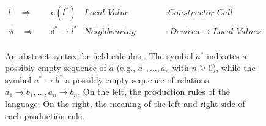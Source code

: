 \begin{figure}
{\begin{minipage}{0.95\textwidth}
\begin{align*}
        l \quad\Rightarrow\quad    & \texttt{c}(l^*)                      & \textit{Local Value}          & : \textit{Constructor Call}                          \\
        \phi \quad\Rightarrow\quad & \delta^* \rightarrow l^*             & \textit{Neighbouring Value}   & : \textit{Devices} \rightarrow \textit{Local Values} \\
      \end{align*}
    \end{minipage}
  }
  \caption[An abstract syntax for field calculus]{
  An abstract syntax for field calculus \cite{FieldCalculus-AggregateComputing}.
  The symbol $a^*$ indicates a possibly empty sequence of $a$ (e.g.,
  $a_1,...,a_n$ with $n \geq 0$), while the symbol $a^*{\rightarrow}b^*$ a
  possibly empty sequence of relations $a_1{\rightarrow}b_1,...,a_n{\rightarrow}b_n$.
  On the left, the production rules of the language. On the right, the
  meaning of the left and right side of each production rule.
  }
  \label{figure:field-calculus-language}
\end{figure}